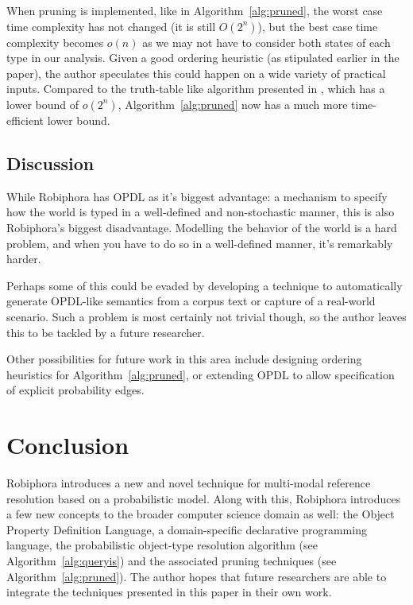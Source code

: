 \documentclass[12pt]{article}
\begin{document}
When pruning is implemented, like in Algorithm~\ref{alg:pruned}, the worst case
time complexity has not changed (it is still $O(2^n)$), but the best case time
complexity becomes $o(n)$ as we may not have to consider both states of each
type in our analysis. Given a good ordering heuristic (as stipulated earlier in
the paper), the author speculates this could happen on a wide variety of
practical inputs. Compared to the truth-table like algorithm presented in
\cite{chai04}, which has a lower bound of $o(2^n)$, Algorithm~\ref{alg:pruned}
now has a much more time-efficient lower bound.

\subsection{Discussion}

While Robiphora has OPDL as it's biggest advantage: a mechanism to specify how
the world is typed in a well-defined and non-stochastic manner, this is also
Robiphora's biggest disadvantage. Modelling the behavior of the world is a hard
problem, and when you have to do so in a well-defined manner, it's remarkably
harder.

Perhaps some of this could be evaded by developing a technique to automatically
generate OPDL-like semantics from a corpus text or capture of a real-world
scenario. Such a problem is most certainly not trivial though, so the author
leaves this to be tackled by a future researcher.

Other possibilities for future work in this area include designing ordering
heuristics for Algorithm~\ref{alg:pruned}, or extending OPDL to allow
specification of explicit probability edges.

\section{Conclusion}

Robiphora introduces a new and novel technique for multi-modal reference
resolution based on a probabilistic model. Along with this, Robiphora
introduces a few new concepts to the broader computer science domain as well:
the Object Property Definition Language, a domain-specific declarative
programming language, the probabilistic object-type resolution algorithm (see
Algorithm~\ref{alg:queryis}) and the associated pruning techniques (see
Algorithm~\ref{alg:pruned}). The author hopes that future researchers are able
to integrate the techniques presented in this paper in their own work.
\end{document}
